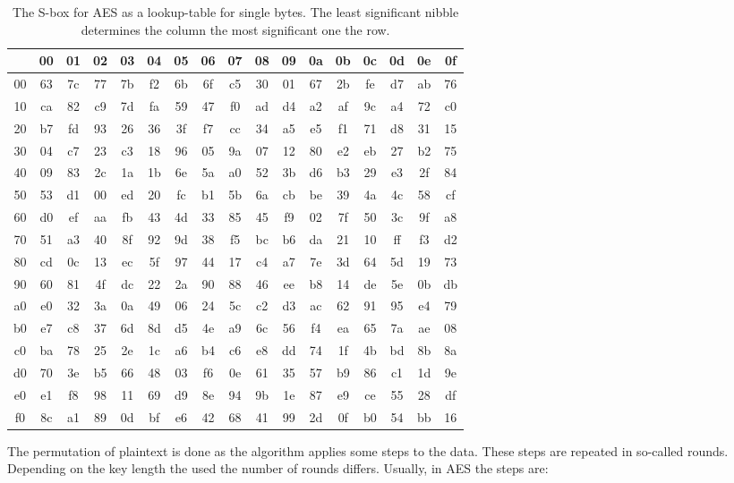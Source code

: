 \begin{table}[]
\centering
\begin{tabular}{c|cccccccccccccccc}
   & 00 & 01 & 02 & 03 & 04 & 05 & 06 & 07 & 08 & 09 & 0a & 0b & 0c & 0d & 0e &
0f \\ \hline
00 & 63 & 7c & 77 & 7b & f2 & 6b & 6f & c5 & 30 & 01 & 67 & 2b & fe & d7 & ab &
76 \\
10 & ca & 82 & c9 & 7d & fa & 59 & 47 & f0 & ad & d4 & a2 & af & 9c & a4 & 72 &
c0 \\
20 & b7 & fd & 93 & 26 & 36 & 3f & f7 & cc & 34 & a5 & e5 & f1 & 71 & d8 & 31 &
15 \\
30 & 04 & c7 & 23 & c3 & 18 & 96 & 05 & 9a & 07 & 12 & 80 & e2 & eb & 27 & b2 &
75 \\
40 & 09 & 83 & 2c & 1a & 1b & 6e & 5a & a0 & 52 & 3b & d6 & b3 & 29 & e3 & 2f &
84 \\
50 & 53 & d1 & 00 & ed & 20 & fc & b1 & 5b & 6a & cb & be & 39 & 4a & 4c & 58 &
cf \\
60 & d0 & ef & aa & fb & 43 & 4d & 33 & 85 & 45 & f9 & 02 & 7f & 50 & 3c & 9f &
a8 \\
70 & 51 & a3 & 40 & 8f & 92 & 9d & 38 & f5 & bc & b6 & da & 21 & 10 & ff & f3 &
d2 \\
80 & cd & 0c & 13 & ec & 5f & 97 & 44 & 17 & c4 & a7 & 7e & 3d & 64 & 5d & 19 &
73 \\
90 & 60 & 81 & 4f & dc & 22 & 2a & 90 & 88 & 46 & ee & b8 & 14 & de & 5e & 0b &
db \\
a0 & e0 & 32 & 3a & 0a & 49 & 06 & 24 & 5c & c2 & d3 & ac & 62 & 91 & 95 & e4 &
79 \\
b0 & e7 & c8 & 37 & 6d & 8d & d5 & 4e & a9 & 6c & 56 & f4 & ea & 65 & 7a & ae &
08 \\
c0 & ba & 78 & 25 & 2e & 1c & a6 & b4 & c6 & e8 & dd & 74 & 1f & 4b & bd & 8b &
8a \\
d0 & 70 & 3e & b5 & 66 & 48 & 03 & f6 & 0e & 61 & 35 & 57 & b9 & 86 & c1 & 1d &
9e \\
e0 & e1 & f8 & 98 & 11 & 69 & d9 & 8e & 94 & 9b & 1e & 87 & e9 & ce & 55 & 28 &
df \\
f0 & 8c & a1 & 89 & 0d & bf & e6 & 42 & 68 & 41 & 99 & 2d & 0f & b0 & 54 & bb &
16
\end{tabular}
\caption{The S-box for AES as a lookup-table for single bytes. The least
significant nibble determines the column the most significant one the row.}
\label{tab:sbox}
\end{table}

The permutation of plaintext is done as the algorithm applies some steps to the
data. These steps are repeated in so-called rounds. Depending on the key length
the used the number of rounds differs. Usually, in AES the steps are:

